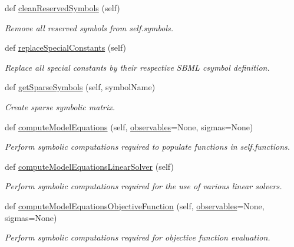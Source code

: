 \begin{DoxyCompactItemize}
def \mbox{\hyperlink{classamici_1_1sbml__import_1_1_sbml_importer_a122b9921e2fb5bd0fc75310c47413dd1}{clean\+Reserved\+Symbols}} (self)
\begin{DoxyCompactList}\small\item\em Remove all reserved symbols from self.\+symbols. \end{DoxyCompactList}\item 
def \mbox{\hyperlink{classamici_1_1sbml__import_1_1_sbml_importer_a5348e7b5041334f8c54b45c5c928dea0}{replace\+Special\+Constants}} (self)
\begin{DoxyCompactList}\small\item\em Replace all special constants by their respective S\+B\+ML csymbol definition. \end{DoxyCompactList}\item 
def \mbox{\hyperlink{classamici_1_1sbml__import_1_1_sbml_importer_ab2f94e5b08034c5e07a26886369b71fd}{get\+Sparse\+Symbols}} (self, symbol\+Name)
\begin{DoxyCompactList}\small\item\em Create sparse symbolic matrix. \end{DoxyCompactList}\item 
def \mbox{\hyperlink{classamici_1_1sbml__import_1_1_sbml_importer_a028d8f30b90a236b7f5e8335a6e87ff4}{compute\+Model\+Equations}} (self, \mbox{\hyperlink{classamici_1_1sbml__import_1_1_sbml_importer_a9617913dfb4b9fa413012566e226bee0}{observables}}=None, sigmas=None)
\begin{DoxyCompactList}\small\item\em Perform symbolic computations required to populate functions in {\ttfamily self.\+functions}. \end{DoxyCompactList}\item 
def \mbox{\hyperlink{classamici_1_1sbml__import_1_1_sbml_importer_a8d851cd7e0fd6f00e3c85e615de3f796}{compute\+Model\+Equations\+Linear\+Solver}} (self)
\begin{DoxyCompactList}\small\item\em Perform symbolic computations required for the use of various linear solvers. \end{DoxyCompactList}\item 
def \mbox{\hyperlink{classamici_1_1sbml__import_1_1_sbml_importer_a0912a62ab201e0bb9b4ecb5c42894398}{compute\+Model\+Equations\+Objective\+Function}} (self, \mbox{\hyperlink{classamici_1_1sbml__import_1_1_sbml_importer_a9617913dfb4b9fa413012566e226bee0}{observables}}=None, sigmas=None)
\begin{DoxyCompactList}\small\item\em Perform symbolic computations required for objective function evaluation. \end{DoxyCompactList}\item 

\end{DoxyCompactItemize}
